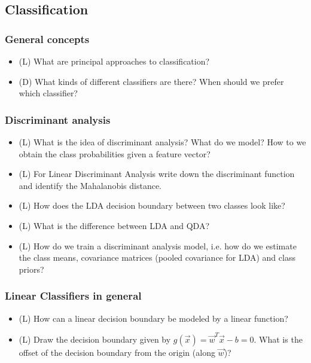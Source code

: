 \subsection*{Classification}

\subsubsection*{General concepts}

\begin{itemize}
    \item (L) What are principal approaches to classification?
    \item (D) What kinds of different classifiers are there? When should we prefer which classifier?
\end{itemize}

\subsubsection*{Discriminant analysis}

\begin{itemize}
    \item (L) What is the idea of discriminant analysis? What do we model? How to we obtain the class probabilities given a feature vector?
    \item (L) For Linear Discriminant Analysis write down the discriminant function and identify 
    the Mahalanobis distance.
    \item (L) How does the LDA decision boundary between two classes look like?
    \item (L) What is the difference between LDA and QDA?
    \item (L) How do we train a discriminant analysis model, i.e. how do we estimate
    the class means, covariance matrices (pooled covariance for LDA) and class priors?
\end{itemize}

\subsubsection*{Linear Classifiers in general}
\begin{itemize}
    \item (L) How can a linear decision boundary be modeled by a linear function?
    \item (L) Draw the decision boundary given by $g(\vec{x}) = \vec{w}^T \vec{x} - b = 0$. 
    What is the offset of the decision boundary from the origin (along $\vec{w}$)?
\end{itemize}

